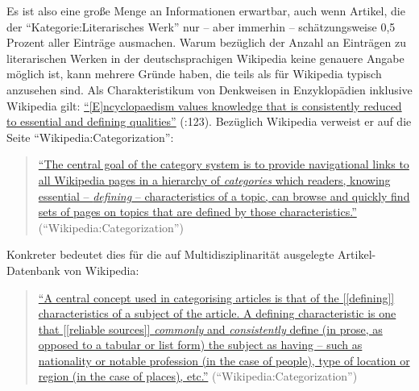 \documentclass[fontsize=12pt]{scrartcl}
\begin{document}
Es ist also eine gro{\ss}e Menge an Informationen erwartbar, auch wenn Artikel, die der "`Kategorie:Li\-te\-ra\-risches Werk"' nur -- aber immerhin -- sch\"atzungsweise 0,5 Prozent aller Eintr\"age ausmachen. Warum bez\"uglich der Anzahl an Eintr\"agen zu li\-te\-ra\-rischen Werken in der deutschspra\-chi\-gen Wi\-ki\-pe\-dia keine genauere Angabe m\"oglich ist, kann meh\-rere Gr\"unde haben, die teils als f\"ur Wi\-ki\-pe\-dia ty\-pisch anzusehen sind. Als Charakteristikum von Denkweisen in Enzyklop\"adien inklusive Wi\-ki\-pe\-dia gilt: \href{http://pierrelevyblog.files.wordpress.com/2013/05/stevejankowski_thesis_v18.pdf}{"`[E]ncyclopaedism values know\-ledge that is consistently reduced to essential and defining qualities"'} (\cite{Jankowski2013}:123). Bez\"uglich Wi\-ki\-pe\-dia verweist er auf die Seite "`Wi\-ki\-pe\-dia:Categorization"': 

\singlespacing
\begin{quote}
\href{https://en.wikipedia.org/w/index.php?title=Wikipedia:Categorization\&oldid=644735441}{"`The central goal of the category system is to provide navigational links to all Wi\-ki\-pe\-dia pages in a hierarchy of \textit{categories} which readers, knowing essential -- \textit{defining} -- characteristics of a topic, can browse and quickly find sets of pages on topics that are defined by those characteristics."'} ("`Wikipedia:Categorization"')
\end{quote}
\onehalfspacing

Konkreter bedeutet dies f\"ur die auf Multidisziplinarit\"at ausgelegte Artikel-Da\-ten\-bank von Wikipedia:

\singlespacing
\begin{quote}
\href{https://en.wikipedia.org/w/index.php?title=Wikipedia:Categorization\&oldid=644735441}{"`A central concept used in categorising articles is that of the [[defining]] characteristics of a subject of the article. A defining characteristic is one that [[reliable sources]] \textit{commonly} and \textit{consistently} define ({\footnotesize in prose, as opposed to a tabular or list form}) the subject as having -- such as nationality or notable profession (in the case of people), type of location or region (in the case of places), etc."'} ("`Wikipedia:Categorization"')
\end{quote}
\onehalfspacing
\end{document}
